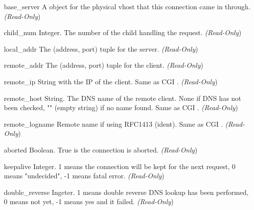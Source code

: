 \begin{memberdesc}[connection]{base_server}
A  object for the physical vhost that this connection came in
through.
\emph{(Read-Only})
\end{memberdesc}

\begin{memberdesc}[connection]{child_num}
Integer. The number of the child handling the request.
\emph{(Read-Only})
\end{memberdesc}

\begin{memberdesc}[connection]{local_addr}
The (address, port) tuple for the server.
\emph{(Read-Only})
\end{memberdesc}

\begin{memberdesc}[connection]{remote_addr}
The (address, port) tuple for the client.
\emph{(Read-Only})
\end{memberdesc}

\begin{memberdesc}[connection]{remote_ip}
String with the IP of the client. Same as CGI .
\emph{(Read-Only})
\end{memberdesc}

\begin{memberdesc}[connection]{remote_host}
String. The DNS name of the remote client. None if DNS has not been
checked, "" (empty string) if no name found. Same as CGI .
\emph{(Read-Only})
\end{memberdesc}

\begin{memberdesc}[connection]{remote_logname}
Remote name if using RFC1413 (ident). Same as CGI .
\emph{(Read-Only})
\end{memberdesc}

\begin{memberdesc}[connection]{aborted}
Boolean. True is the connection is aborted.
\emph{(Read-Only})
\end{memberdesc}

\begin{memberdesc}[connection]{keepalive}
Integer. 1 means the connection will be kept for the next request, 0 means
"undecided", -1 means fatal error.
\emph{(Read-Only})
\end{memberdesc}

\begin{memberdesc}[connection]{double_reverse}
Ingeter. 1 means double reverse DNS lookup has been performed, 0 means
not yet, -1 means yes and it failed.
\emph{(Read-Only})
\end{memberdesc}


